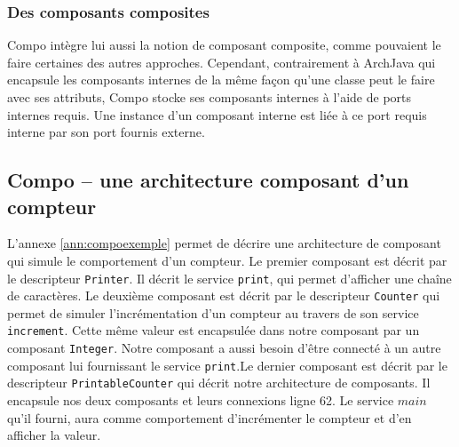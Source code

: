    \subsubsection{Des composants composites}
      
    Compo intègre lui aussi la notion de composant composite, comme pouvaient le faire certaines des autres approches. Cependant, contrairement à ArchJava qui encapsule les composants internes de la même façon qu'une classe peut le faire avec ses attributs, Compo stocke ses composants internes à l'aide de ports internes requis. Une instance d'un composant interne est liée à ce port requis interne par son port fournis externe.
  
    \subsection{Compo -- une architecture composant d'un compteur}
    
    L'annexe \ref{ann:compoexemple} permet de décrire une architecture de composant qui simule le comportement d'un compteur. Le premier composant est décrit par le descripteur \texttt{Printer}. Il décrit le service \texttt{print}, qui permet d'afficher une chaîne de caractères. Le deuxième composant est décrit par le descripteur \texttt{Counter} qui permet de simuler l'incrémentation d'un compteur au travers de son service \texttt{increment}. Cette même valeur est encapsulée dans notre composant par un composant \texttt{Integer}. Notre composant a aussi besoin d'être connecté à un autre composant lui fournissant le service \texttt{print}.Le dernier composant est décrit par le descripteur \texttt{PrintableCounter} qui décrit notre architecture de composants. Il encapsule nos deux composants et leurs connexions ligne 62. Le service $main$ qu'il fourni, aura comme comportement d'incrémenter le compteur et d'en afficher la valeur.  
    
      
      
      


      
      

